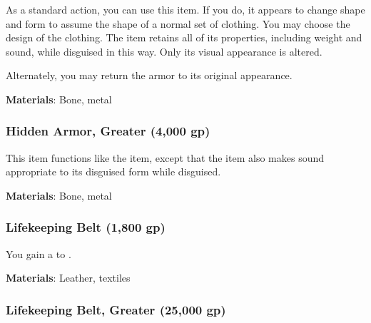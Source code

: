 As a standard action, you can use this item.
If you do, it appears to change shape and form to assume the shape of a normal set of clothing.
You may choose the design of the clothing.
The item retains all of its properties, including weight and sound, while disguised in this way.
Only its visual appearance is altered.

Alternately, you may return the armor to its original appearance.



\vspace{0.25em}
\textbf{Materials}: Bone, metal


\lowercase{\hypertarget{item:Hidden Armor, Greater}{}}\label{item:Hidden Armor, Greater}
\hypertarget{item:Hidden Armor, Greater}{\subsubsection{Hidden Armor, Greater\hfill{} (4,000 gp)}}

This item functions like the  item, except that the item also makes sound appropriate to its disguised form while disguised.



\vspace{0.25em}
\textbf{Materials}: Bone, metal


\lowercase{\hypertarget{item:Lifekeeping Belt}{}}\label{item:Lifekeeping Belt}
\hypertarget{item:Lifekeeping Belt}{\subsubsection{Lifekeeping Belt\hfill{} (1,800 gp)}}

You gain a   to .



\vspace{0.25em}
\textbf{Materials}: Leather, textiles


\lowercase{\hypertarget{item:Lifekeeping Belt, Greater}{}}\label{item:Lifekeeping Belt, Greater}
\hypertarget{item:Lifekeeping Belt, Greater}{\subsubsection{Lifekeeping Belt, Greater\hfill{} (25,000 gp)}}

